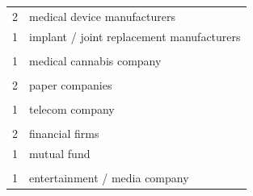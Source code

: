 \documentclass[final]{article}
\begin{document}
\begin{table}[H]
\begin{tabular}{@{}cl@{}}
  2 & medical device manufacturers \\
  1 & implant / joint replacement manufacturers \\
  & \\
  1 & medical cannabis company \\
  & \\
  2 & paper companies \\
  & \\
  1 & telecom company \\
  & \\
  2 & financial firms \\
  1 & mutual fund \\
    & \\
  1 & entertainment / media company \\
  \bottomrule
\end{tabular}
\end{table}











\end{document}
